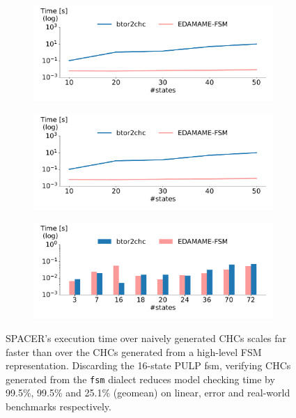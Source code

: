 \documentclass[acmsmall,screen,review]{acmart}
\begin{document}
\begin{figure}[t]
  \centering
  \begin{subfigure}{\columnwidth}
  \includegraphics[width=\columnwidth]{chc-plots/safety-sat_chc_lin.pdf}
  \label{fig:chc-lin}
  \end{subfigure}
  \begin{subfigure}{\columnwidth}
  \includegraphics[width=\columnwidth]{chc-plots/safety-sat_chc_lin.pdf}
  \label{fig:chc-err}
  \end{subfigure}
  \begin{subfigure}{\columnwidth}
  \includegraphics[width=\columnwidth]{chc-plots/safety-sat_chc_realworlds.pdf}
  \label{fig:chc-rw}
  \end{subfigure}
  \caption[]{SPACER's execution time over naively generated CHCs scales far faster than over the CHCs generated from a high-level FSM representation.
    Discarding the 16-state PULP \ac{fsm}, verifying CHCs generated from the \texttt{fsm} dialect reduces model checking time by 99.5\%, 99.5\% and 25.1\% (geomean) on 
    linear, error and real-world benchmarks respectively.
  }
  \label{fig:chc-comparison}
\end{figure}
\end{document}
